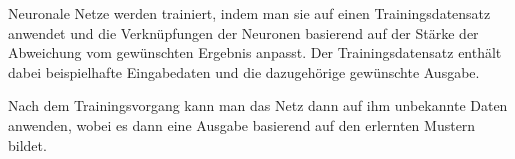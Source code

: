 \bigbreak\noindent
Neuronale Netze werden trainiert, indem man sie auf einen Trainingsdatensatz anwendet und die Verknüpfungen der Neuronen basierend auf der Stärke der Abweichung vom gewünschten Ergebnis anpasst.
Der Trainingsdatensatz enthält dabei beispielhafte Eingabedaten und die dazugehörige gewünschte Ausgabe.

\bigbreak\noindent
Nach dem Trainingsvorgang kann man das Netz dann auf ihm unbekannte Daten anwenden, wobei es dann eine Ausgabe basierend auf den erlernten Mustern bildet.